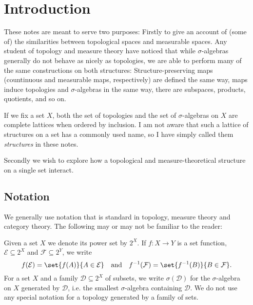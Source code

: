 \documentclass[article, a4paper, 11pt, oneside]{memoir}
\title{\doctitle}
\author{\docauthor}
\numberwithin{equation}{chapter}
\newcommand{\calE}{\mathcal{E}}
\newcommand{\calD}{\mathcal{D}}
\newcommand{\calF}{\mathcal{F}}
\newcommand{\powerset}[1]{2^{#1}}
\newcommand{\preim}{^{-1}}
\begin{document}
\maketitle

\chapter{Introduction}

These notes are meant to serve two purposes: Firstly to give an account of (some of) the similarities between topological spaces and measurable spaces. Any student of topology and measure theory have noticed that while $\sigma$-algebras generally do not behave as nicely as topologies, we are able to perform many of the same constructions on both structures: Structure-preserving maps (countinuous and measurable maps, respectively) are defined the same way, maps induce topologies and $\sigma$-algebras in the same way, there are subspaces, products, quotients, and so on.

If we fix a set $X$, both the set of topologies and the set of $\sigma$-algebras on $X$ are complete lattices when ordered by inclusion. I am not aware that such a lattice of structures on a set has a commonly used name, so I have simply called them \emph{structures} in these notes.

Secondly we wish to explore how a topological and measure-theoretical structure on a single set interact.


\section{Notation}

We generally use notation that is standard in topology, measure theory and category theory. The following may or may not be familiar to the reader:

Given a set $X$ we denote its power set by $\powerset{X}$. If $f \colon X \to Y$ is a set function, $\calE \subseteq \powerset{X}$ and $\calF \subseteq \powerset{Y}$, we write
%
\begin{equation*}
    f(\calE)
        = \set{f(A)}{A \in \calE}
    \quad \text{and} \quad
    f\preim(\calF)
        = \set{f\preim(B)}{B \in \calF}.
\end{equation*}
%
For a set $X$ and a family $\calD \subseteq \powerset{X}$ of subsets, we write $\sigma(\calD)$ for the $\sigma$-algebra on $X$ generated by $\calD$, i.e. the smallest $\sigma$-algebra containing $\calD$. We do not use any special notation for a topology generated by a family of sets.
\end{document}
